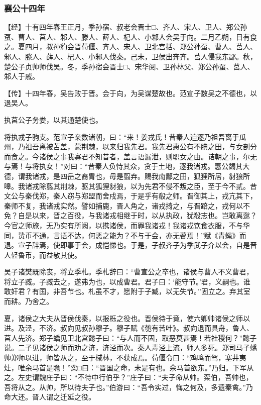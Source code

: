 \documentclass[]{article}
\begin{document}
\hypertarget{header-n1988}{%
\subsubsection{襄公十四年}\label{header-n1988}}

【经】十有四年春王正月，季孙宿、叔老会晋士□、齐人、宋人、卫人、郑公孙虿、曹人、莒人、邾人、滕人、薛人、杞人、小邾人会吴于向。二月乙朔，日有食之。夏四月，叔孙豹会晋荀偃、齐人、宋人、卫北宫括、郑公孙虿、曹人、莒人、邾人、滕人、薛人、杞人、小邾人伐秦。己未，卫侯出奔齐。莒人侵我东鄙。秋，楚公子贞帅师伐吴。冬，季孙宿会晋士□、宋华阅、卫孙林父、郑公孙虿、莒人、邾人于戚。

【传】十四年春，吴告败于晋。会于向，为吴谋楚故也。范宣子数吴之不德也，以退吴人。

执莒公子务娄，以其通楚使也。

将执戎子驹支。范宣子亲数诸朝，曰：``来！姜戎氏！昔秦人迫逐乃祖吾离于瓜州，乃祖吾离被苫盖，蒙荆棘，以来归我先君。我先君惠公有不腆之田，与女剖分而食之。今诸侯之事我寡君不知昔者，盖言语漏泄，则职女之由。诘朝之事，尔无与焉！与将执女！''对曰：``昔秦人负恃其众，贪于土地，逐我诸戎。惠公蠲其大德，谓我诸戎，是四岳之裔胄也，毋是翦弃。赐我南鄙之田，狐狸所居，豺狼所嗥。我诸戎除翦其荆棘，驱其狐狸豺狼，以为先君不侵不叛之臣，至于今不贰。昔文公与秦伐郑，秦人窃与郑盟而舍戍焉，于是乎有殽之师。晋御其上，戎亢其下，秦师不复，我诸戎实然。譬如捕鹿，晋人角之，诸戎掎之，与晋踣之，戎何以不免？自是以来，晋之百役，与我诸戎相继于时，以从执政，犹殽志也。岂敢离逖？今官之师旅，无乃实有所阙，以携诸侯，而罪我诸戎！我诸戎饮食衣服，不与华同，贽币不通，言语不达，何恶之能为？不与于会，亦无瞢焉！''赋《青蝇》而退。宣子辞焉，使即事于会，成恺悌也。于是，子叔齐子为季武子介以会，自是晋人轻鲁币，而益敬其使。

吴子诸樊既除丧，将立季札。季札辞曰：``曹宣公之卒也，诸侯与曹人不义曹君，将立子臧。子臧去之，遂弗为也，以成曹君。君子曰：`能守节。'君，义嗣也。谁敢奸君？有国，非吾节也。札虽不才，愿附于子臧，以无失节。''固立之。弃其室而耕。乃舍之。

夏，诸侯之大夫从晋侯伐秦，以报栎之役也。晋侯待于竟，使六卿帅诸侯之师以进。及泾，不济。叔向见叔孙穆子。穆子赋《匏有苦叶》。叔向退而具舟，鲁人、莒人先济。郑子蟜见卫北宫懿子曰：``与人而不固，取恶莫甚焉！若社稷何？''懿子说。二子见诸侯之师而劝之济，济泾而次。秦人毒泾上流，师人多死。郑司马子蟜帅郑师以进，师皆从之，至于棫林，不获成焉。荀偃令曰：``鸡鸣而驾，塞井夷灶，唯余马首是瞻！''栾□曰：``晋国之命，未是有也。余马首欲东。''乃归。下军从之。左史谓魏庄子曰：``不待中行伯乎？''庄子曰：``夫子命从帅。栾伯，吾帅也，吾将从之。从帅，所以待夫子也。''伯游曰：``吾令实过，悔之何及，多遗秦禽。''乃命大还。晋人谓之迁延之役。
\end{document}
